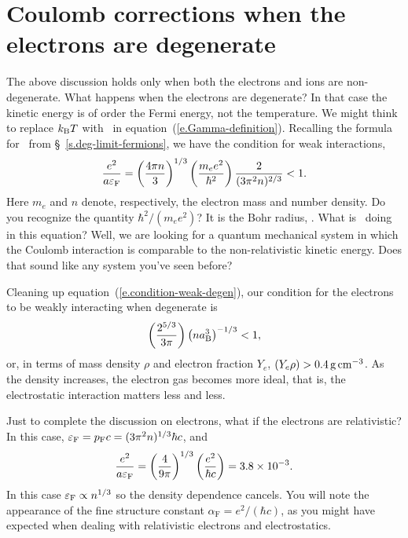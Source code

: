\section[Strongly Coupled Plasmas]{Coulomb corrections when the electrons are degenerate}\label{s.degenerate-coulomb}

The above discussion holds only when both the electrons and ions are non-degenerate.  What happens when the electrons are degenerate?  In that case the kinetic energy is of order the Fermi energy, not the temperature.  We might think to replace $k_\mathrm{B} T$ with \eF\ in equation~(\ref{e.Gamma-definition}). Recalling the formula for \eF\ from \S~\ref{s.deg-limit-fermions}, we have the condition for weak interactions,
\begin{equation}\label{e.condition-weak-degen}
\frac{e^{2}}{a \varepsilon_{\mathrm{F}}} = \left(\frac{4\pi n}{3}\right)^{1/3}\left(\frac{m_{e} e^{2}}{\hbar^{2}}\right)\frac{2}{(3\pi^{2} n)^{2/3}} < 1.
\end{equation}
Here $m_{e}$ and $n$ denote, respectively, the electron mass and number density.  Do you recognize the quantity $\hbar^{2}/(m_{e}e^{2})$?  It is the Bohr radius, \abohr.  What is \abohr\ doing in this equation?  Well, we are looking for a quantum mechanical system in which the Coulomb interaction is comparable to the non-relativistic kinetic energy.  Does that sound like any system you've seen before?

Cleaning up equation~(\ref{e.condition-weak-degen}), our condition for the electrons to be weakly interacting when degenerate is
\begin{equation}
\left(\frac{2^{5/3}}{3\pi}\right)\left( n a_{\mathrm{B}}^{3}\right)^{-1/3} < 1,
\end{equation}
or, in terms of mass density $\rho$ and electron fraction $Y_{e}$, $(Y_{e}\rho) > 0.4\,\mathrm{g}\,{\mathrm{c}\mathrm{m}}^{-3}$.  As the density increases, the electron gas becomes more ideal, that is, the electrostatic interaction matters less and less.  

Just to complete the discussion on electrons, what if the electrons are relativistic?  In this case, $\varepsilon_{\mathrm{F}} = p_{\mathrm{F}} c = (3\pi^{2}n)^{1/3}\hbar c$, and
\begin{equation}\label{e.condition-weak-rel-degen}
\frac{e^{2}}{a \varepsilon_{\mathrm{F}}} = \left(\frac{4}{9\pi}\right)^{1/3}\left(\frac{e^{2}}{\hbar c}\right) = 3.8\times 10^{-3}.
\end{equation}
In this case $\varepsilon_{\mathrm{F}} \propto n^{1/3}$ so the density dependence cancels.  You will note the appearance of the fine structure constant $\alpha_{\mathrm{F}} = e^{2}/(\hbar c)$, as you might have expected when dealing with relativistic electrons and electrostatics.

